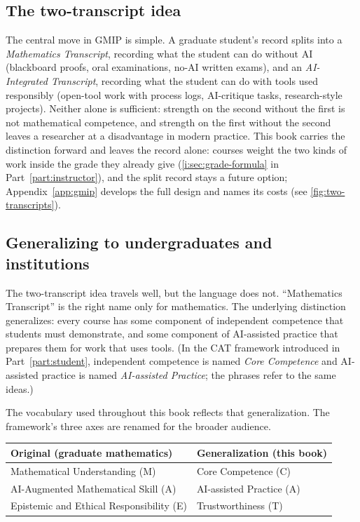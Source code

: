 \documentclass{SIAMbook2023}
\begin{document}
\begin{thepreface}
\subsection*{The two-transcript idea}

The central move in GMIP is simple. A graduate student's record splits into a \emph{Mathematics Transcript}, recording what the student can do without AI (blackboard proofs, oral examinations, no-AI written exams), and an \emph{AI-Integrated Transcript}, recording what the student can do with tools used responsibly (open-tool work with process logs, AI-critique tasks, research-style projects). Neither alone is sufficient: strength on the second without the first is not mathematical competence, and strength on the first without the second leaves a researcher at a disadvantage in modern practice. This book carries the distinction forward and leaves the record alone: courses weight the two kinds of work inside the grade they already give (\cref{i:sec:grade-formula} in Part~\ref{part:instructor}), and the split record stays a future option; Appendix~\ref{app:gmip} develops the full design and names its costs (see \cref{fig:two-transcripts}).

\subsection*{Generalizing to undergraduates and institutions}

The two-transcript idea travels well, but the language does not. ``Mathematics Transcript'' is the right name only for mathematics. The underlying distinction generalizes: every course has some component of independent competence that students must demonstrate, and some component of AI-assisted practice that prepares them for work that uses tools. (In the CAT framework introduced in Part~\ref{part:student}, independent competence is named \emph{Core Competence} and AI-assisted practice is named \emph{AI-assisted Practice}; the phrases refer to the same ideas.)

The vocabulary used throughout this book reflects that generalization. The framework's three axes are renamed for the broader audience.

\begin{center}
\begin{tabular}{p{}p{}}
\toprule
\textbf{Original (graduate mathematics)} & \textbf{Generalization (this book)} \\
\midrule
Mathematical Understanding (M) & Core Competence (C) \\
AI-Augmented Mathematical Skill (A) & AI-assisted Practice (A) \\
Epistemic and Ethical Responsibility (E) & Trustworthiness (T) \\
\bottomrule
\end{tabular}
\end{center}


\end{thepreface}
\end{document}

